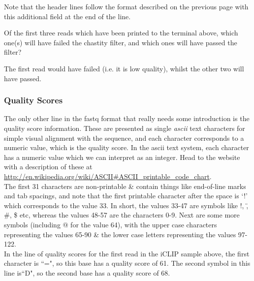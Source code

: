 Note that the header lines follow the format described on the previous page with this additional field at the end of the line.
\begin{questions}
Of the first three reads which have been printed to the terminal above, which one(s) will have failed the chastity filter, and which ones will have passed the filter?\\
\begin{answer}
The first read would have failed (i.e. it is low quality), whilst the other two will have passed.
\end{answer}
\end{questions}

\subsubsection{Quality Scores}
\begin{information}
The only other line in the fastq format that really needs some introduction is the quality score information.
These are presented as single \textit{ascii} text characters for simple visual alignment with the sequence, and each character corresponds to a numeric value, which is the quality score.
In the ascii text system, each character has a numeric value which we can interpret as an integer.
Head to the website with a description of these at \url{http://en.wikipedia.org/wiki/ASCII#ASCII\_printable\_code\_chart}.\\

The first 31 characters are non-printable \& contain things like end-of-line marks and tab spacings, and note that the first printable character after the space is `!' which corresponds to the value 33.
In short, the values 33-47 are symbols like !, \", \#, \$ etc, whereas the values 48-57 are the characters 0-9.
Next are some more symbols (including @ for the value 64), with the upper case characters representing the values 65-90 \& the lower case letters representing the values 97-122.\\

In the line of quality scores for the first read in the iCLIP sample above, the first character is ``=", so this base has a quality score of 61.
The second symbol in this line is``D", so the second base has a quality score of 68.
\end{information}

